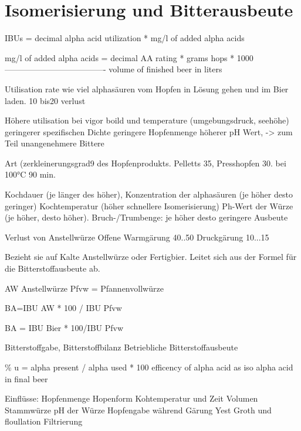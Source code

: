 \documentclass[a4paper,parskip=half]{scrartcl}
\begin{document}
\section*{Isomerisierung und Bitterausbeute}


\parencite{Tinseth1997}
IBUs = decimal alpha acid utilization * mg/l of added alpha acids

mg/l of added alpha acids = decimal AA rating * grams hops * 1000
                            -------------------------------------
                              volume of finished beer in liters
                              

\parencite[50]{Holle2010}
Utilisation rate wie viel alphasäuren vom Hopfen in Lösung gehen
und im Bier laden. 10 bis20 verlust

Höhere utilisation bei
vigor boild und temperature (umgebungsdruck, seehöhe)
geringerer spezifischen Dichte
geringere Hopfenmenge
höherer pH Wert, -> zum Teil unangenehmere Bittere

\parencite[159]{Annemueller2015}

Art (zerkleinerungsgrad9 des Hopfenprodukts. Pelletts 35, Presshopfen
30. bei 100°C 90 min.

Kochdauer (je länger des höher), Konzentration der alphasäuren (je höher desto geringer)
Kochtemperatur (höher schnellere Isomerisierung)
Ph-Wert der Würze (je höher, desto höher).
Bruch-/Trumbenge: je höher desto geringere Ausbeute 

\parencite[160]{Annemueller2015}
Verlust von Anstellwürze
Offene Warmgärung 40..50
Druckgärung 10...15

\parencite[162\psq]{Annemueller2015}
Bezieht sie auf Kalte Anstellwürze oder Fertigbier. Leitet sich aus der
Formel für die Bitterstoffausbeute ab. 

AW Anstellwürze
Pfvw = Pfannenvollwürze

BA=IBU AW * 100 / IBU Pfvw

BA = IBU Bier * 100/IBU Pfvw

\parencite[160-164]{Annemueller2015}
Bitterstoffgabe, Bitterstoffbilanz
Betriebliche Bitterstoffausbeute

\parencite[124]{Garetz1994} 

\% u = alpha present / alpha used * 100
efficency of alpha acid as iso alpha acid in final beer

Einflüsse:
Hopfenmenge
Hopenform
Kohtemperatur und Zeit
Volumen
Stammwürze
pH der Würze
Hopfengabe während Gärung
Yest Groth und floullation
Filtrierung
\end{document}
